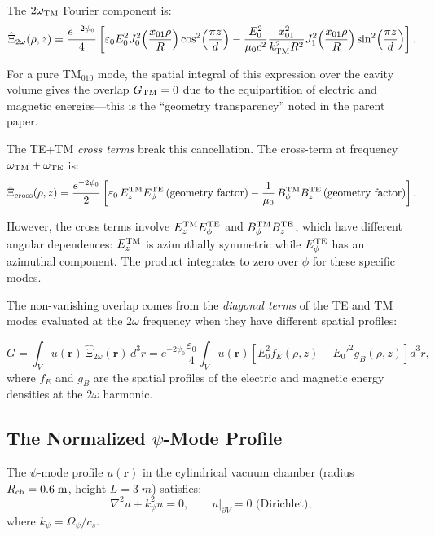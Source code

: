\documentclass[aps,prd,twocolumn,superscriptaddress,nofootinbib]{revtex4-2}
\begin{document}
The $2\omega_{\rm TM}$ Fourier component is:
\begin{equation}
\hat{\Xi}_{2\omega}(\rho,z) = \frac{e^{-2\psi_0}}{4}\left[
\varepsilon_0 E_0^2 J_0^2\!\left(\frac{x_{01}\rho}{R}\right)\cos^2\!\left(\frac{\pi z}{d}\right)
- \frac{E_0^2}{\mu_0 c^2}\frac{x_{01}^2}{k_{\rm TM}^2 R^2}J_1^2\!\left(\frac{x_{01}\rho}{R}\right)\sin^2\!\left(\frac{\pi z}{d}\right)
\right].
\label{eq:Xi-2omega}
\end{equation}

For a pure TM$_{010}$ mode, the spatial integral of this expression
over the cavity volume gives the overlap $G_{\rm TM} = 0$ due to the
equipartition of electric and magnetic energies---this is the
``geometry transparency'' noted in the parent paper.

The TE+TM \emph{cross terms} break this cancellation.  The
cross-term at frequency $\omega_{\rm TM} + \omega_{\rm TE}$ is:
\begin{equation}
\hat{\Xi}_{\rm cross}(\rho,z) = \frac{e^{-2\psi_0}}{2}\left[
\varepsilon_0\,E_z^{\rm TM}E_\phi^{\rm TE}\,(\text{geometry factor})
- \frac{1}{\mu_0}\,B_\phi^{\rm TM}B_z^{\rm TE}\,(\text{geometry factor})
\right].
\end{equation}

However, the cross terms involve $E_z^{\rm TM}E_\phi^{\rm TE}$
and $B_\phi^{\rm TM}B_z^{\rm TE}$, which have different angular
dependences: $E_z^{\rm TM}$ is azimuthally symmetric while
$E_\phi^{\rm TE}$ has an azimuthal component.  The product
integrates to zero over $\phi$ for these specific modes.

The non-vanishing overlap comes from the \emph{diagonal terms}
of the TE and TM modes evaluated at the $2\omega$ frequency
when they have different spatial profiles:

\begin{equation}
G = \int_V u(\mathbf{r})\,\hat{\Xi}_{2\omega}(\mathbf{r})\,d^3r
= e^{-2\psi_0}\frac{\varepsilon_0}{4}\int_V u(\mathbf{r})\left[E_0^2 f_E(\rho,z) - E_0'^2 g_B(\rho,z)\right]d^3r,
\label{eq:overlap-full}
\end{equation}
where $f_E$ and $g_B$ are the spatial profiles of the electric and
magnetic energy densities at the $2\omega$ harmonic.

\subsection{The Normalized $\psi$-Mode Profile}

The $\psi$-mode profile $u(\mathbf{r})$ in the cylindrical vacuum
chamber (radius $R_{\rm ch} = 0.6\;\si{m}$, height $L = 3\;\si{m}$)
satisfies:
\begin{equation}
\nabla^2 u + k_\psi^2 u = 0, \qquad u|_{\partial V} = 0 \text{ (Dirichlet)},
\end{equation}
where $k_\psi = \Omega_\psi/c_s$.
\end{document}

